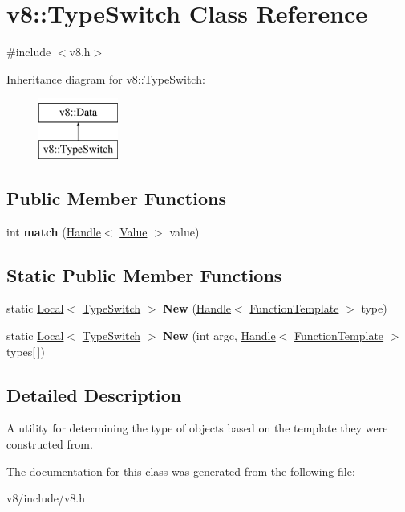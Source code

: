 \hypertarget{classv8_1_1TypeSwitch}{}\section{v8\+:\+:Type\+Switch Class Reference}
\label{classv8_1_1TypeSwitch}


{\ttfamily \#include $<$v8.\+h$>$}

Inheritance diagram for v8\+:\+:Type\+Switch\+:\begin{figure}[H]
\begin{center}
\leavevmode
\includegraphics[height=2.000000cm]{classv8_1_1TypeSwitch}
\end{center}
\end{figure}
\subsection*{Public Member Functions}
\begin{DoxyCompactItemize}
\item 
\hypertarget{classv8_1_1TypeSwitch_a678fe45db1e97ba46df7359b51752483}{}int {\bfseries match} (\hyperlink{classv8_1_1Handle}{Handle}$<$ \hyperlink{classv8_1_1Value}{Value} $>$ value)\label{classv8_1_1TypeSwitch_a678fe45db1e97ba46df7359b51752483}

\end{DoxyCompactItemize}
\subsection*{Static Public Member Functions}
\begin{DoxyCompactItemize}
\item 
\hypertarget{classv8_1_1TypeSwitch_ac94aac0b1ba0bde763bc8b6ae6aea532}{}static \hyperlink{classv8_1_1Local}{Local}$<$ \hyperlink{classv8_1_1TypeSwitch}{Type\+Switch} $>$ {\bfseries New} (\hyperlink{classv8_1_1Handle}{Handle}$<$ \hyperlink{classv8_1_1FunctionTemplate}{Function\+Template} $>$ type)\label{classv8_1_1TypeSwitch_ac94aac0b1ba0bde763bc8b6ae6aea532}

\item 
\hypertarget{classv8_1_1TypeSwitch_a47003915e553a7ca2285b8a0bf42993b}{}static \hyperlink{classv8_1_1Local}{Local}$<$ \hyperlink{classv8_1_1TypeSwitch}{Type\+Switch} $>$ {\bfseries New} (int argc, \hyperlink{classv8_1_1Handle}{Handle}$<$ \hyperlink{classv8_1_1FunctionTemplate}{Function\+Template} $>$ types\mbox{[}$\,$\mbox{]})\label{classv8_1_1TypeSwitch_a47003915e553a7ca2285b8a0bf42993b}

\end{DoxyCompactItemize}


\subsection{Detailed Description}
A utility for determining the type of objects based on the template they were constructed from. 

The documentation for this class was generated from the following file\+:\begin{DoxyCompactItemize}
\item 
v8/include/v8.\+h\end{DoxyCompactItemize}
